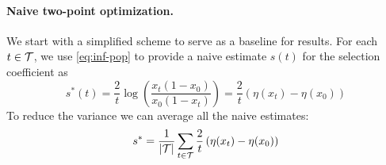 \documentclass[11pt]{article}
\begin{document}
\paragraph{Naive two-point optimization.} We start with a simplified
scheme to serve as a baseline for results.  For each $t\in {\cal T}$, we
use \eqref{eq:inf-pop} to provide a naive estimate $s(t)$ for the
selection coefficient as
\begin{equation}
	s^*(t)=\frac{2}{t} \log \left( \frac{x_t(1-x_0)}{x_0 (1-x_t)} \right) = \frac{2}{t}  
	\left( \eta(x_t)-\eta(x_0)\right)
	\label{eq:naive2point}
\end{equation}
To reduce the variance we can average all the naive estimates: 
\begin{equation}
	s^*=\frac{1}{|{\cal T}|}\sum_{t\in {\cal T}}\frac{2}{t}  \left( \eta(x_t)-\eta(x_0)\right)
	\label{eq:naive}
\end{equation}
\end{document}
